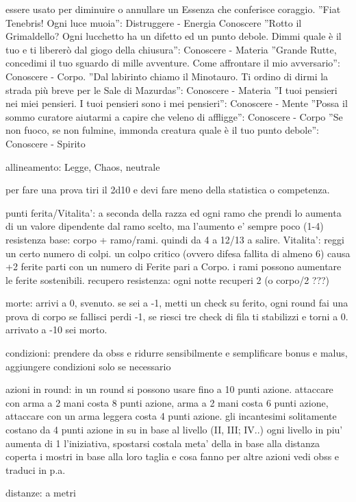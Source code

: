\documentclass[12pt,a4paper,twoside,openany]{book}
\begin{document}
essere usato per diminuire o annullare un Essenza che conferisce coraggio. ”Fiat Tenebris! Ogni luce muoia”:
Distruggere - Energia
Conoscere
”Rotto il Grimaldello? Ogni lucchetto ha un difetto ed un punto debole. Dimmi quale è il tuo e ti libererò
dal giogo della chiusura”: Conoscere - Materia
”Grande Rutte, concedimi il tuo sguardo di mille avventure. Come affrontare il mio avversario”: Conoscere -
Corpo.
”Dal labirinto chiamo il Minotauro. Ti ordino di dirmi la strada più breve per le Sale di Mazurdas”: Conoscere
- Materia
”I tuoi pensieri nei miei pensieri. I tuoi pensieri sono i mei pensieri”: Conoscere - Mente
”Possa il sommo curatore aiutarmi a capire che veleno di affligge”: Conoscere - Corpo
”Se non fuoco, se non fulmine, immonda creatura quale è il tuo punto debole”: Conoscere - Spirito



allineamento:  Legge, Chaos, neutrale


per fare una prova tiri il 2d10 e devi fare meno della statistica o competenza. 


punti ferita/Vitalita': a seconda della razza ed ogni ramo che prendi lo aumenta di un valore dipendente dal ramo scelto, ma l'aumento e' sempre poco (1-4)
resistenza base: corpo + ramo/rami. quindi da 4 a 12/13 a salire. 
Vitalita':  reggi un certo numero di colpi. un colpo critico (ovvero difesa fallita di almeno 6) causa +2 ferite
parti con un numero di Ferite pari a Corpo. i rami possono aumentare le ferite sostenibili. 
recupero resistenza: ogni notte recuperi 2 (o corpo/2 ???)

morte: arrivi a 0, svenuto. se sei a -1, metti un check su ferito, ogni round fai una prova di corpo se fallisci perdi -1, se riesci tre check di fila ti stabilizzi e torni a 0. arrivato a -10 sei morto.

condizioni: prendere da obss e ridurre sensibilmente  e semplificare bonus e malus, aggiungere condizioni solo se necessario

azioni in round: in un round si possono usare fino a 10 punti azione. attaccare con arma a 2 mani costa 8 punti azione, arma a 2 mani costa 6 punti azione, attaccare con un arma leggera costa 4 punti azione. gli incantesimi solitamente costano da 4 punti azione in su in base  al livello (II, III; IV..) ogni livello in piu' aumenta di 1 l'iniziativa, spostarsi costala meta' della in base alla distanza coperta
i mostri in base alla loro taglia e cosa fanno
per altre azioni vedi obss e traduci in p.a.

distanze: a metri
\end{document}

